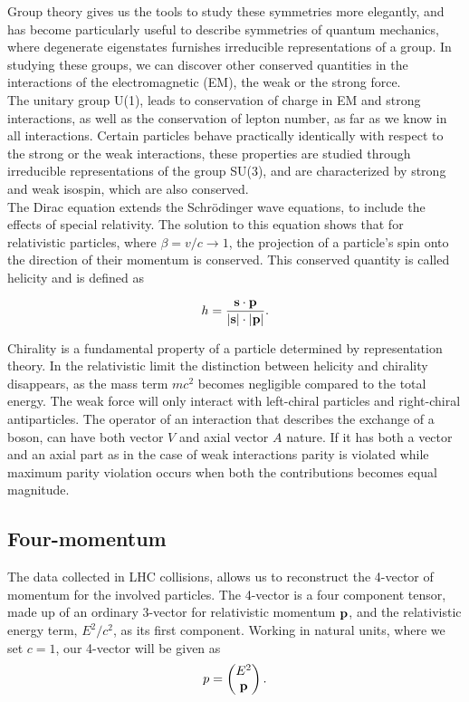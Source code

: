 \documentclass[11pt,a4paper]{article}
\begin{document}
Group theory gives us the tools to study these symmetries more elegantly, and
has become particularly useful to describe symmetries of quantum mechanics,
where degenerate eigenstates furnishes irreducible representations of a group.
In studying these groups, we can discover other conserved quantities in the
interactions of the electromagnetic (EM), the weak or the strong force.\\

The unitary group U(1), leads to conservation of charge in EM and strong
interactions, as well as the conservation of lepton number, as far as
we know in all interactions. Certain particles behave practically identically
with respect to the strong or the weak interactions, these properties are
studied through irreducible representations of the group SU(3), and are
characterized by strong and weak isospin, which are also conserved.\\

The Dirac equation extends the Schrödinger wave equations, to include the
effects of special relativity. The solution to this equation shows that for
relativistic particles, where $\beta = v/c \rightarrow 1$, the projection of a particle's spin
onto the direction of their momentum is conserved. This conserved quantity is
called helicity and is defined as

\begin{equation} h = \frac{\vb s \cdot \vb p}{\abs{\vb s} \cdot \abs{\vb p}}.
\end{equation}

Chirality is a fundamental property of a particle determined by representation
theory. In the relativistic limit the distinction between helicity and chirality
disappears, as the mass term $mc^2$ becomes negligible compared to the total
energy. The weak force will only interact with left-chiral particles and
right-chiral antiparticles. The operator of an interaction that describes the
exchange of a boson, can have both vector $V$ and axial vector $A$ nature. If it
has both a vector and an axial part as in the case of weak interactions parity
is violated while maximum parity violation occurs when both the contributions
becomes equal magnitude.

\subsection{Four-momentum}
The data collected in LHC collisions, allows us to reconstruct the 4-vector of
momentum for the involved particles. The 4-vector is a four component tensor,
made up of an ordinary 3-vector for relativistic momentum $\vb p$, and the
relativistic energy term, $E^2/c^2$, as its first component. Working in natural
units, where we set $c=1$, our 4-vector will be given as
\begin{equation}
p = \left(\begin{matrix} E^2 \\ \vb p \end{matrix} \right).
\end{equation}
\end{document}
